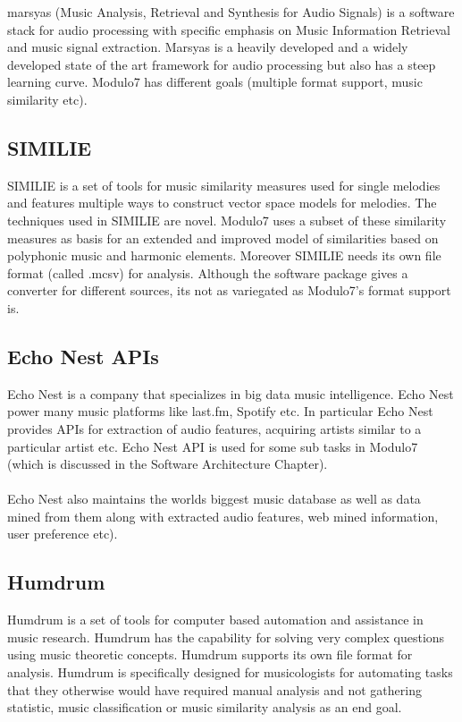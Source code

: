 \noindent marsyas \cite{marsyas} (Music Analysis, Retrieval and Synthesis for Audio Signals) is a software stack for audio processing with specific emphasis on Music Information Retrieval and music signal extraction. Marsyas is a heavily developed and a widely developed state of the art framework for audio processing but also has a steep learning curve. Modulo7 has different goals (multiple format support, music similarity etc). 

\subsection{SIMILIE}

\noindent SIMILIE \cite{similie} is a set of tools for music similarity measures used for single  melodies and features multiple ways to construct vector space models for melodies. The techniques used in SIMILIE are novel. Modulo7 uses a subset of these similarity measures as basis for an extended and improved model of similarities based on polyphonic music and harmonic elements. Moreover SIMILIE needs its own file format (called .mcsv) for analysis. Although the software package gives a converter for different sources, its not as variegated as Modulo7's format support is.

\subsection{Echo Nest APIs}

\noindent Echo Nest is a company that specializes in big data music intelligence. Echo Nest power many music platforms like last.fm, Spotify etc. In particular Echo Nest provides APIs for extraction of audio features, acquiring artists similar to a particular artist etc. Echo Nest API is used for some sub tasks in Modulo7 (which is discussed in the Software Architecture Chapter). \\\\
Echo Nest also maintains the worlds biggest music database as well as data mined from them along with extracted audio features, web mined information, user preference etc). 

\subsection{Humdrum}

\noindent Humdrum \cite{humdrum} is a set of tools for computer based automation and assistance in music research. Humdrum has the capability for solving very complex questions using music theoretic concepts. Humdrum supports its own file format for analysis. Humdrum is specifically designed for musicologists for automating tasks that they otherwise would have required manual analysis and not gathering statistic, music classification or music similarity analysis as an end goal.


